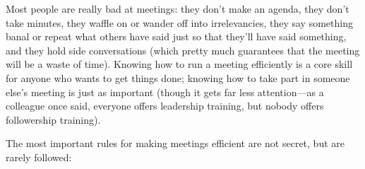 
Most people are really bad at meetings:
they don't make an agenda,
they don't take minutes,
they waffle on or wander off into irrelevancies,
they say something banal or repeat what others have said
just so that they'll have said something,
and they hold side conversations
(which pretty much guarantees that the meeting will be a waste of time).
Knowing how to run a meeting efficiently
is a core skill for anyone who wants to get things done;
knowing how to take part in someone else's meeting is just as important
(though it gets far less attention---as a colleague once said,
everyone offers leadership training,
but nobody offers followership training).

The most important rules for making meetings efficient are not secret,
but are rarely followed:

